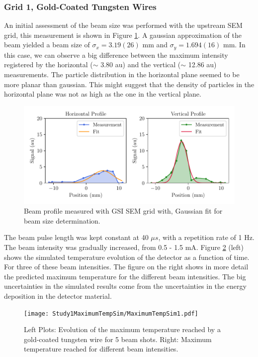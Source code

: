 \subsubsection{Grid 1, Gold-Coated Tungsten Wires}

An initial assessment of the beam size was performed with the upstream SEM grid, this measurement is shown in Figure \ref{fig:BeamProfileStudy1}. A gaussian approximation of the beam yielded a beam size of $\sigma_x = 3.19(26)$ mm and $\sigma_y = 1.694(16)$ mm. In this case, we can observe a big difference between the maximum intensity registered by the horizontal ($\sim$ 3.80 au) and the vertical ($\sim$ 12.86 au) measurements. The particle distribution in the horizontal plane seemed to be more planar than gaussian. This might suggest that the density of particles in the horizontal plane was not as high as the one in the vertical plane. 

\begin{figure}[h]
    \centering
    \includegraphics[width=1.0\columnwidth]{ThermalStudyBeamProfile1/ProfileMeasurementStudy1.pdf}
    \caption{Beam profile measured with GSI SEM grid with, Gaussian fit for beam size determination.}
    \label{fig:BeamProfileStudy1}
\end{figure}

The beam pulse length was kept constant at 40 $\mu s$, with a repetition rate of 1 Hz. The beam intensity was gradually increased, from 0.5 - 1.5 mA. Figure \ref{fig:MaxTempStudy1} (left) shows the simulated temperature evolution of the detector as a function of time. For three of these beam intensities. The figure on the right shows in more detail the predicted maximum temperature for the different beam intensities. The big uncertainties in the simulated results come from the uncertainties in the energy deposition in the detector material.

\begin{figure}[h]
    \centering
    \texttt{[image: Study1MaximumTempSim/MaximumTempSim1.pdf]}
    \caption{Left Plots: Evolution of the maximum temperature reached by a gold-coated tungsten wire for 5 beam shots. Right: Maximum temperature reached for different beam intensities. }
    \label{fig:MaxTempStudy1}
\end{figure}

